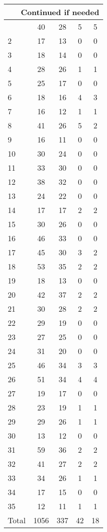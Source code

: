 \begin{center}
\begin{longtable}{l|c|c|c|c}
\hline \multicolumn{5}{|r|}{{Continued if needed}} \\ \hline
\endfoot 
1 & 40 & 28 & 5 & 5\\ \hline
2 & 17 & 13 & 0 & 0\\ \hline
3 & 18 & 14 & 0 & 0\\ \hline
4 & 28 & 26 & 1 & 1\\ \hline
5 & 25 & 17 & 0 & 0\\ \hline
6 & 18 & 16 & 4 & 3\\ \hline
7 & 16 & 12 & 1 & 1\\ \hline
8 & 41 & 26 & 5 & 2\\ \hline
9 & 16 & 11 & 0 & 0\\ \hline
10 & 30 & 24 & 0 & 0\\ \hline
11 & 33 & 30 & 0 & 0\\ \hline
12 & 38 & 32 & 0 & 0\\ \hline
13 & 24 & 22 & 0 & 0\\ \hline
14 & 17 & 17 & 2 & 2\\ \hline
15 & 30 & 26 & 0 & 0\\ \hline
16 & 46 & 33 & 0 & 0\\ \hline
17 & 45 & 30 & 3 & 2\\ \hline
18 & 53 & 35 & 2 & 2\\ \hline
19 & 18 & 13 & 0 & 0\\ \hline
20 & 42 & 37 & 2 & 2\\ \hline
21 & 30 & 28 & 2 & 2\\ \hline
22 & 29 & 19 & 0 & 0\\ \hline
23 & 27 & 25 & 0 & 0\\ \hline
24 & 31 & 20 & 0 & 0\\ \hline
25 & 46 & 34 & 3 & 3\\ \hline
26 & 51 & 34 & 4 & 4\\ \hline
27 & 19 & 17 & 0 & 0\\ \hline
28 & 23 & 19 & 1 & 1\\ \hline
29 & 29 & 26 & 1 & 1\\ \hline
30 & 13 & 12 & 0 & 0\\ \hline
31 & 59 & 36 & 2 & 2\\ \hline
32 & 41 & 27 & 2 & 2\\ \hline
33 & 34 & 26 & 1 & 1\\ \hline
34 & 17 & 15 & 0 & 0\\ \hline
35 & 12 & 11 & 1 & 1\\ \hline
\hline \hline
Total & 1056 & 337 & 42 & 18



\end{longtable}
\end{center}

